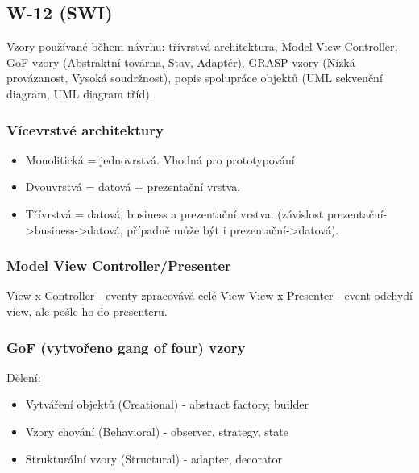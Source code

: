 \subsection{W-12 (SWI)}
Vzory používané během návrhu: třívrstvá architektura, Model View Controller, GoF vzory (Abstraktní továrna, Stav, Adaptér), GRASP vzory (Nízká provázanost, Vysoká soudržnost), popis spolupráce objektů (UML sekvenční diagram, UML diagram tříd).

\subsubsection*{Vícevrstvé architektury}
\begin{itemize}
  \item Monolitická = jednovrstvá. Vhodná pro prototypování
  \item Dvouvrstvá = datová + prezentační vrstva.
  \item Třívrstvá = datová, business a prezentační vrstva. (závislost prezentační->business->datová, případně může být i prezentační->datová).
\end{itemize}

\subsubsection*{Model View Controller/Presenter}
View x Controller - eventy zpracovává celé View
View x Presenter - event odchydí view, ale pošle ho do presenteru.

\subsubsection*{GoF (vytvořeno gang of four) vzory}

Dělení:
\begin{itemize}
  \item Vytváření objektů (Creational) - abstract factory, builder
  \item Vzory chování (Behavioral) - observer, strategy, state
  \item Strukturální vzory (Structural) - adapter, decorator
\end{itemize}

